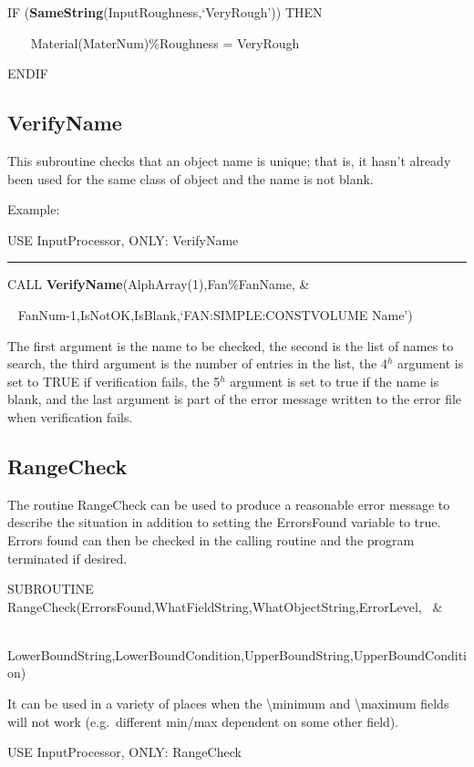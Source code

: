 IF (\textbf{SameString}(InputRoughness,`VeryRough')) THEN

~~~ Material(MaterNum)\%Roughness = VeryRough

ENDIF

\subsection{VerifyName}\label{verifyname}

This subroutine checks that an object name is unique; that is, it hasn't already been used for the same class of object and the name is not blank.

Example:

USE InputProcessor, ONLY: VerifyName

\begin{center}\rule{0.5\linewidth}{\linethickness}\end{center}

CALL \textbf{VerifyName}(AlphArray(1),Fan\%FanName, \&

~ FanNum-1,IsNotOK,IsBlank,`FAN:SIMPLE:CONSTVOLUME Name')

The first argument is the name to be checked, the second is the list of names to search, the third argument is the number of entries in the list, the 4\(^{h}\) argument is set to TRUE if verification fails, the 5\(^{h}\) argument is set to true if the name is blank, and the last argument is part of the error message written to the error file when verification fails.

\subsection{RangeCheck}\label{rangecheck}

The routine RangeCheck can be used to produce a reasonable error message to describe the situation in addition to setting the ErrorsFound variable to true.~ Errors found can then be checked in the calling routine and the program terminated if desired.

SUBROUTINE RangeCheck(ErrorsFound,WhatFieldString,WhatObjectString,ErrorLevel,~ \&

~~~~~~~~~~~~~~~~~~~~~ LowerBoundString,LowerBoundCondition,UpperBoundString,UpperBoundCondition)

It can be used in a variety of places when the \textbackslash{}minimum and \textbackslash{}maximum fields will not work (e.g.~different min/max dependent on some other field).

USE InputProcessor, ONLY: RangeCheck


